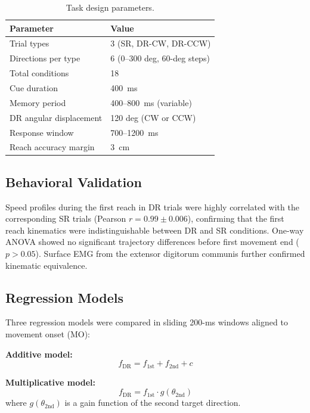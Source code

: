 \documentclass[12pt]{article}
\begin{document}
\begin{table}[ht]
\centering
\caption{Task design parameters.}
\label{tab:taskparams}
\begin{tabular}{ll}
\toprule
Parameter & Value \\
\midrule
Trial types & 3 (SR, DR-CW, DR-CCW) \\
Directions per type & 6 (0--300 deg, 60-deg steps) \\
Total conditions & 18 \\
Cue duration & 400~ms \\
Memory period & 400--800~ms (variable) \\
DR angular displacement & 120 deg (CW or CCW) \\
Response window & 700--1200~ms \\
Reach accuracy margin & 3~cm \\
\bottomrule
\end{tabular}
\end{table}

\subsection{Behavioral Validation}

Speed profiles during the first reach in DR trials were highly correlated with the corresponding SR trials (Pearson $r = 0.99 \pm 0.006$), confirming that the first reach kinematics were indistinguishable between DR and SR conditions. One-way ANOVA showed no significant trajectory differences before first movement end ($p > 0.05$). Surface EMG from the extensor digitorum communis further confirmed kinematic equivalence.

\subsection{Regression Models}

Three regression models were compared in sliding 200-ms windows aligned to movement onset (MO):

\textbf{Additive model:}
\begin{equation}
f_{\text{DR}} = f_{\text{1st}} + f_{\text{2nd}} + c
\label{eq:additive}
\end{equation}

\textbf{Multiplicative model:}
\begin{equation}
f_{\text{DR}} = f_{\text{1st}} \cdot g(\theta_{\text{2nd}})
\label{eq:multiplicative}
\end{equation}
where $g(\theta_{\text{2nd}})$ is a gain function of the second target direction.
\end{document}
